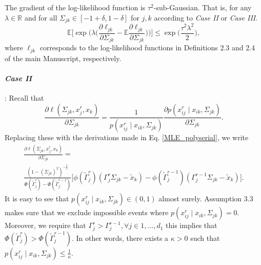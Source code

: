 \begin{condition}\label{Gradient statistical noise}
    The gradient of the log-likelihood function is $\tau^2$-sub-Gaussian. That is, for any $\lambda \in \mathbb{R}$ and for all $\Sigma_{jk} \in [-1+\delta, 1-\delta]$ for $j,k$ according to \textit{Case II} or \textit{Case III}.
    \begin{equation}
        \mathbb{E}\Bigg[\exp\Bigg(\lambda \Big(\frac{\partial\ell_{jk}}{\partial \Sigma_{jk}} - \mathbb{E}\frac{\partial\ell_{jk}}{\partial \Sigma_{jk}} \Big) \Bigg)\Bigg] \leq \exp\Big(\frac{\tau^2\lambda^2}{2}\Big),
    \end{equation}
    where $\ell_{jk}$ corresponds to the log-likelihood functions in Definitions 2.3 and 2.4 of the main Manuscript, respectively.
    \paragraph{\textit{Case II}}: Recall that
    \begin{equation*}
        \frac{\partial\ell(\Sigma_{jk}, x_j^r,x_k)}{\partial \Sigma_{jk}} = \frac{1}{p(x_{ij}^{r} \mid x_{ik}, \Sigma_{jk})} \frac{\partial p(x_{ij}^{r} \mid x_{ik}, \Sigma_{jk})}{\partial \Sigma_{jk}}.
    \end{equation*}
    Replacing these with the derivations made in Eq. \eqref{MLE_polyserial}, we write
    \begin{multline*}
        \frac{\partial\ell(\Sigma_{jk}, x_j^r,x_k)}{\partial \Sigma_{jk}} = \\
        \frac{(1-(\Sigma_{jk})^2)^{-\frac{3}{2}}}{\Phi({\tilde{\Gamma}}_j^{r}) - \Phi({\tilde{\Gamma}}_j^{r-1})} \Bigg[\phi({\tilde{\Gamma}}_j^{r})({\Gamma}_j^r\Sigma_{jk} - {\tilde{x}}_{k}) - \phi({\tilde{\Gamma}}_j^{r-1})({\Gamma}_j^{r-1}\Sigma_{jk} - {\tilde{x}}_{k})\Bigg].
    \end{multline*}
    It is easy to see that $p(x_{ij}^{r} \mid x_{ik}, \Sigma_{jk}) \in (0,1)$ almost surely. Assumption 3.3
    makes sure that we exclude impossible events where $p(x_{ij}^{r} \mid x_{ik}, \Sigma_{jk}) = 0$. Moreover, we require that $\Gamma_j^r > \Gamma_j^{r-1}, \forall j \in 1, \dots, d_1$ this implies that $\Phi({\tilde{\Gamma}}_j^{r}) > \Phi({\tilde{\Gamma}}_j^{r-1})$. In other words, there exists a $\kappa >0$ such that $p(x_{ij}^{r} \mid x_{ik}, \Sigma_{jk}) \leq \frac{1}{\kappa}$.


\end{condition}
